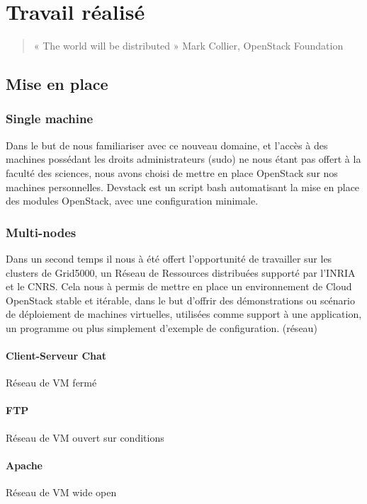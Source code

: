 \documentclass{report}
\begin{document}
\newpage
\chapter{Travail réalisé}
    \begin{quote}
        « The world will be distributed » Mark Collier, OpenStack Foundation
    \end{quote}
    \bigbreak
    \section{Mise en place}
        \subsection{Single machine}
            Dans le but de nous familiariser avec ce nouveau domaine,
            et l'accès à des machines possédant les droits administrateurs (sudo)
            ne nous étant pas offert à la faculté des sciences,
            nous avons choisi de mettre en place OpenStack sur nos machines personnelles.\break
            Devstack est un script bash automatisant la mise en place des modules OpenStack, 
            avec une configuration minimale.\break

        \subsection{Multi-nodes}
            Dans un second temps il nous à été offert l'opportunité de travailler sur les clusters
            de Grid5000, un Réseau de Ressources distribuées supporté par l'INRIA et le CNRS.\break
            Cela nous à permis de mettre en place un environnement de Cloud OpenStack stable et itérable, 
			dans le but d'offrir des démonstrations ou scénario de déploiement de machines virtuelles,
			utilisées comme support à une application, un programme ou plus simplement d'exemple de 
			configuration. (réseau)\break
			\subsubsection{Client-Serveur Chat}
			    Réseau de VM fermé
			\subsubsection{FTP}
				Réseau de VM ouvert sur conditions
			\subsubsection{Apache}
				Réseau de VM wide open
\end{document}
